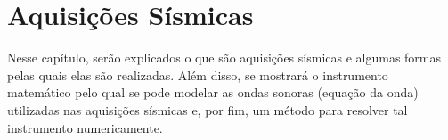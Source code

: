 \chapter{Aquisições Sísmicas}

    \label{chp2}
    
    Nesse capítulo, serão explicados o que são aquisições sísmicas e 
    algumas formas pelas quais elas são realizadas. Além disso, se 
    mostrará o instrumento matemático pelo qual se pode modelar as 
    ondas sonoras (equação da onda) utilizadas nas aquisições 
    sísmicas e, por fim, um método para resolver tal instrumento 
    numericamente.

    

    

    
